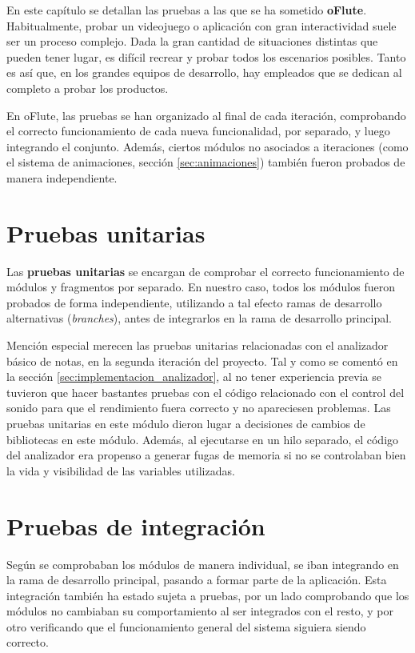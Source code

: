 En este capítulo se detallan las pruebas a las que se ha sometido
\textbf{oFlute}. Habitualmente, probar un videojuego o aplicación con gran
interactividad suele ser un proceso complejo. Dada la gran cantidad de
situaciones distintas que pueden tener lugar, es difícil recrear y probar todos
los escenarios posibles. Tanto es así que, en los grandes equipos de desarrollo,
hay empleados que se dedican al completo a probar los productos.

En oFlute, las pruebas se han organizado al final de cada iteración, comprobando
el correcto funcionamiento de cada nueva funcionalidad, por separado, y luego
integrando el conjunto. Además, ciertos módulos no asociados a iteraciones (como
el sistema de animaciones, sección \ref{sec:animaciones}) también fueron
probados de manera independiente.

\section{Pruebas unitarias}
Las \textbf{pruebas unitarias} se encargan de comprobar el correcto
funcionamiento de módulos y fragmentos por separado. En nuestro caso, todos los
módulos fueron probados de forma independiente, utilizando a tal efecto ramas de
desarrollo alternativas (\textit{branches}), antes de integrarlos en la rama de
desarrollo principal.

Mención especial merecen las pruebas unitarias relacionadas con el analizador
básico de notas, en la segunda iteración del proyecto. Tal y como se comentó en
la sección \ref{sec:implementacion_analizador}, al no tener experiencia previa
se tuvieron que hacer bastantes pruebas con el código relacionado con el control
del sonido para que el rendimiento fuera correcto y no apareciesen
problemas. Las pruebas unitarias en este módulo dieron lugar a decisiones de
cambios de bibliotecas en este módulo. Además, al ejecutarse en un hilo
separado, el código del analizador era propenso a generar fugas de memoria si no
se controlaban bien la vida y visibilidad de las variables utilizadas. 

\section{Pruebas de integración}
Según se comprobaban los módulos de manera individual, se iban integrando en la
rama de desarrollo principal, pasando a formar parte de la aplicación. Esta
integración también ha estado sujeta a pruebas, por un lado comprobando que los
módulos no cambiaban su comportamiento al ser integrados con el resto, y por
otro verificando que el funcionamiento general del sistema siguiera siendo
correcto.

